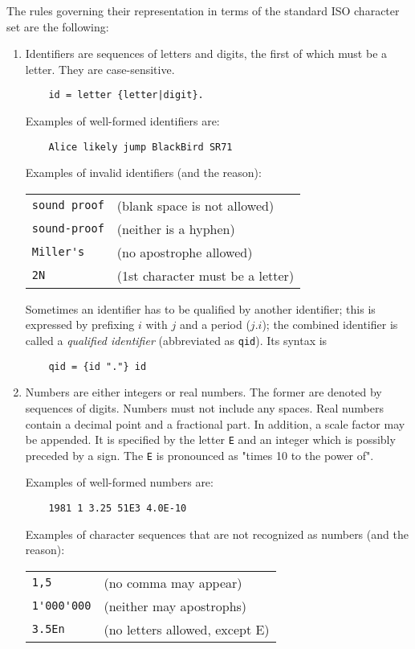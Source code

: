 The rules governing their representation in terms of the standard ISO character set are the following:
\begin{enumerate}
  \item Identifiers are sequences of letters and digits, the first of which must be a letter.
  They are case-sensitive.
  \begin{verbatim}
    id = letter {letter|digit}.
  \end{verbatim}
  Examples of well-formed identifiers are:
  \begin{verbatim}
    Alice likely jump BlackBird SR71
  \end{verbatim}
  Examples of invalid identifiers (and the reason):
  \begin{table}[h!]
    \centering
    \begin{tabular}{l l}
      \verb|sound proof| & (blank space is not allowed) \\
      \verb|sound-proof| & (neither is a hyphen) \\
      \verb|Miller's|    & (no apostrophe allowed) \\
      \verb|2N|          & (1st character must be a letter)
    \end{tabular}
  \end{table}

  Sometimes an identifier has to be qualified by another identifier; this is expressed by
  prefixing $i$ with $j$ and a period ($j.i$); the combined identifier is called a \emph{
  qualified identifier} (abbreviated as \verb|qid|).  Its syntax is
  \begin{verbatim}
    qid = {id "."} id
  \end{verbatim}

  \item Numbers are either integers or real numbers. The former are denoted by sequences of digits.
  Numbers must not include any spaces. Real numbers contain a decimal point and a fractional part.
  In addition, a scale factor may be appended. It is specified by the letter \verb|E| and an integer
  which is possibly preceded by a sign. The \verb|E| is pronounced as "times 10 to the power of".

  Examples of well-formed numbers are:
  \begin{verbatim}
    1981 1 3.25 51E3 4.0E-10
  \end{verbatim}
  Examples of character sequences that are not recognized as numbers (and the reason):
  \begin{table}[h!]
    \centering
    \begin{tabular}{l l}
      \verb|1,5|       & (no comma may appear) \\
      \verb|1'000'000| & (neither may apostrophs) \\
      \verb|3.5En|     & (no letters allowed, except E)
    \end{tabular}
  \end{table}


\end{enumerate}
